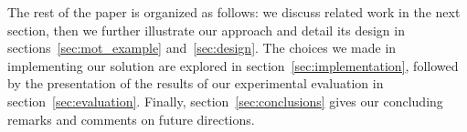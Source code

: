 The rest of the paper is organized as follows: we discuss related work in the 
next section, then we further illustrate our approach and detail its design in 
sections~\ref{sec:mot_example} and~\ref{sec:design}. 
The choices we made in implementing our solution are explored in 
section~\ref{sec:implementation}, followed by the presentation of the results 
of our experimental evaluation in section~\ref{sec:evaluation}. 
Finally, section~\ref{sec:conclusions} gives our concluding remarks and 
comments on future directions.   


